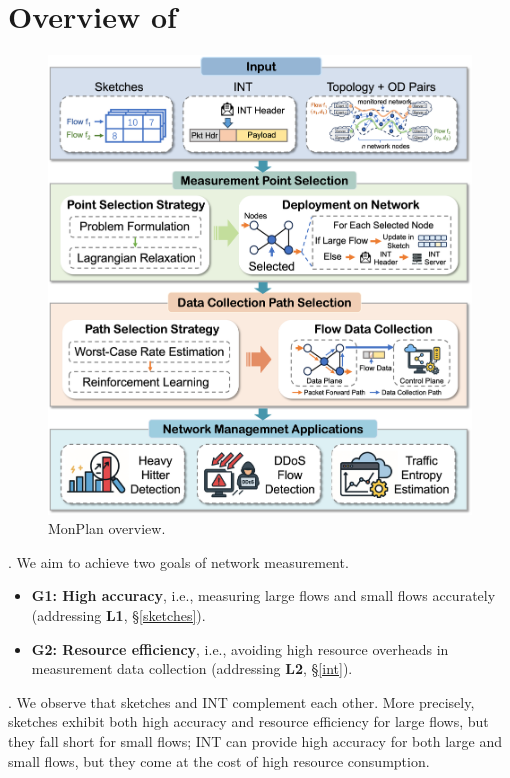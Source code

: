 \section{Overview of \sysname}\label{sec:overview}

\begin{figure}
    \centering
    \includegraphics[width=\linewidth]{pics/overview.png}
    \caption{MonPlan overview.}
    \label{overview}
\end{figure}

. We aim to achieve two goals of network measurement.

\begin{itemize}[leftmargin=*]
%
    \item \textbf{G1: High accuracy}, i.e., measuring large flows and small flows accurately (addressing \textbf{L1}, \S\ref{sketches}). 
%
    \item \textbf{G2: Resource efficiency}, i.e., avoiding high resource overheads in measurement data collection (addressing \textbf{L2}, \S\ref{int}). 
%
\end{itemize}

. We observe that sketches and INT complement each other. More precisely, sketches exhibit both high accuracy and resource efficiency for large flows, but they fall short for small flows; INT can provide high accuracy for both large and small flows, but they come at the cost of high resource consumption. 

